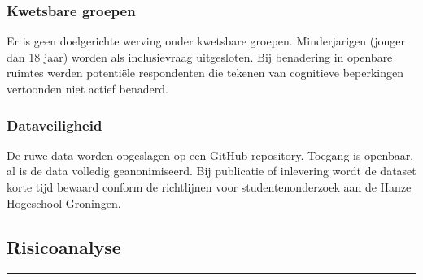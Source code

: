 \documentclass[
]{article}
\begin{document}
\subsubsection{Kwetsbare groepen}\label{kwetsbare-groepen}

Er is geen doelgerichte werving onder kwetsbare groepen. Minderjarigen
(jonger dan 18 jaar) worden als inclusievraag uitgesloten. Bij
benadering in openbare ruimtes werden potentiële respondenten die
tekenen van cognitieve beperkingen vertoonden niet actief benaderd.

\subsubsection{Dataveiligheid}\label{dataveiligheid}

De ruwe data worden opgeslagen op een GitHub-repository. Toegang is
openbaar, al is de data volledig geanonimiseerd. Bij publicatie of
inlevering wordt de dataset korte tijd bewaard conform de richtlijnen
voor studentenonderzoek aan de Hanze Hogeschool Groningen.

\subsection{Risicoanalyse}\label{risicoanalyse}

\begin{center}\rule{0.5\linewidth}{0.5pt}\end{center}
\end{document}
